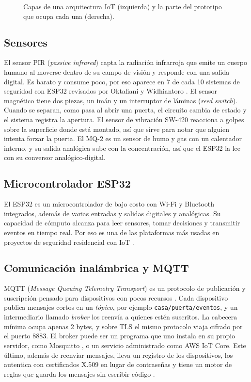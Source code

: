 \documentclass[manuscript,screen,nonacm]{acmart}
\begin{document}
\begin{figure}[htbp]
\centering

\caption{Capas de una arquitectura IoT (izquierda) y la parte del prototipo que ocupa cada una (derecha).}
\label{fig:capas}
\end{figure}

\subsection{Sensores}
El sensor PIR (\emph{passive infrared}) capta la radiación infrarroja que emite un cuerpo humano al moverse dentro de su campo de visión y responde con una salida digital. Es barato y consume poco, por eso aparece en 7 de cada 10 sistemas de seguridad con ESP32 revisados por Oktafiani y Widhiantoro \cite{oktafiani2025esp32}. El sensor magnético tiene dos piezas, un imán y un interruptor de láminas (\emph{reed switch}). Cuando se separan, como pasa al abrir una puerta, el circuito cambia de estado y el sistema registra la apertura. El sensor de vibración SW-420 reacciona a golpes sobre la superficie donde está montado, así que sirve para notar que alguien intenta forzar la puerta. El MQ-2 es un sensor de humo y gas con un calentador interno, y su salida analógica sube con la concentración, así que el ESP32 la lee con su conversor analógico-digital.

\subsection{Microcontrolador ESP32}
El ESP32 es un microcontrolador de bajo costo con Wi-Fi y Bluetooth integrados, además de varias entradas y salidas digitales y analógicas. Su capacidad de cómputo alcanza para leer sensores, tomar decisiones y transmitir eventos en tiempo real. Por eso es una de las plataformas más usadas en proyectos de seguridad residencial con IoT \cite{oktafiani2025esp32, nannung2025iot}.

\subsection{Comunicación inalámbrica y MQTT}
MQTT (\emph{Message Queuing Telemetry Transport}) es un protocolo de publicación y suscripción pensado para dispositivos con pocos recursos \cite{alfuqaha2015survey, light2017mosquitto}. Cada dispositivo publica mensajes cortos en un \emph{tópico}, por ejemplo \texttt{casa/puerta/eventos}, y un intermediario llamado \emph{broker} los reenvía a quienes estén suscritos. La cabecera mínima ocupa apenas 2 bytes, y sobre TLS el mismo protocolo viaja cifrado por el puerto 8883. El broker puede ser un programa que uno instala en su propio servidor, como Mosquitto \cite{light2017mosquitto}, o un servicio administrado como AWS IoT Core. Este último, además de reenviar mensajes, lleva un registro de los dispositivos, los autentica con certificados X.509 en lugar de contraseñas y tiene un motor de reglas que guarda los mensajes sin escribir código \cite{aws2026iot}.
\end{document}
